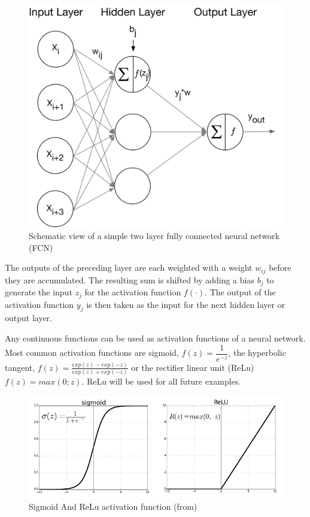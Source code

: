 \begin{figure}[H]
	\centering
	\includegraphics[width=1.0\linewidth]{bilder/grundlagen/fast-forward.png}
	\caption{Schematic view of a  simple two layer fully connected neural network (FCN)}
	\label{fig:FCN}
\end{figure}

The outputs of the preceding layer are each weighted with a weight \(w_{ij}\) before they are accumulated.
The resulting sum is shifted by adding a bias \(b_{j}\) to generate the input \(z_{j}\) for the 
activation function \( f(\cdot) \).
The output of the activation function \(y_{j}\) is then taken as the input for the next 
hidden layer or output layer.
 
 Any continuous functions can be used as activation functions of a neural network. 
 Most common activation functions are sigmoid,  \(f(z) = \dfrac{1}{e^{-z}}\), 
 the hyperbolic tangent, \(f(z) = \frac{exp(z)-exp(-z)}{exp(z)+exp(-z)}\) or the 
 rectifier linear unit (ReLu) \(f(z) = max(0; z)\). ReLu will be used for all future examples.


\begin{figure}[H]
	\centering
	\includegraphics[width=0.8\linewidth]{bilder/grundlagen/sigmoid.png}
	\caption{Sigmoid And ReLu activation function (from\cite{Sigmoid})}
	\label{fig:Sigmoid}
\end{figure}


